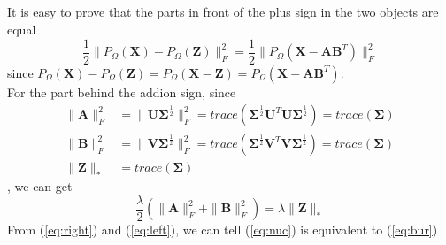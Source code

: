 \documentclass[11pt]{article}
\newcommand{\mtx}[1]{\mathbf{#1}}
\def \mA {\mtx{A}}
\def \mB {\mtx{B}}
\def \mU {\mtx{U}}
\def \mV {\mtx{V}}
\def \mSigma {\mtx{\Sigma}}
\def \mX {\mtx{X}}
\def \mZ {\mtx{Z}}
\begin{document}
\subsection{}
It is easy to prove that the parts in front of the plus sign in the two objects are equal  
\begin{equation}\label{eq:right}
	\frac{1}{2}\|P_\Omega(\mX)-P_\Omega(\mZ)\|_F^2 = \frac{1}{2}\|P_\Omega(\mX-\mA\mB^T)\|_F^2
\end{equation}
since $P_\Omega(\mX)-P_\Omega(\mZ) = P_\Omega(\mX-\mZ) =P_\Omega(\mX-\mA\mB^T)$.\\
For the part behind the addion sign, since
\begin{align*}
	\|\mA\|_F^2 &= \|\mU\mSigma^\frac{1}{2}\|_F^2 = trace(\mSigma^\frac{1}{2}\mU^T\mU\mSigma^\frac{1}{2}) = trace(\mSigma)\\
	\|\mB\|_F^2 &= \|\mV\mSigma^\frac{1}{2}\|_F^2 = trace(\mSigma^\frac{1}{2}\mV^T\mV\mSigma^\frac{1}{2}) = trace(\mSigma)\\
	\|\mZ\|_* &= trace(\mSigma)
\end{align*},
we can get \
\begin{equation}\label{eq:left}
	\frac{\lambda}{2}(\|\mA\|_F^2+\|\mB\|^2_F) = \lambda\|\mZ\|_*
\end{equation}
From (\ref{eq:right}) and (\ref{eq:left}), we can tell (\ref{eq:nuc}) is equivalent to (\ref{eq:bur})
\end{document}
